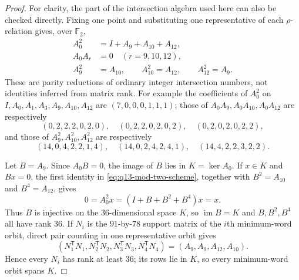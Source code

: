 \documentclass[11pt]{article}
\theoremstyle{remark}
\newcommand{\F}{\mathbb{F}}
\begin{document}
\begin{proof}
For clarity, the part of the intersection algebra used here can also be
checked directly.  Fixing one point and substituting one representative of
each $\rho$-relation gives, over $\F_2$,
\begin{equation}
\label{eq:q13-mod-two-scheme}
\begin{split}
 A_0^2&=I+A_9+A_{10}+A_{12},\\
 A_0A_r&=0\quad(r=9,10,12),\\
 A_9^2&=A_{10},\qquad A_{10}^2=A_{12},\qquad A_{12}^2=A_9.
\end{split}
\end{equation}
These are parity reductions of ordinary integer intersection numbers, not
identities inferred from matrix rank.  For example the coefficients of
$A_0^2$ on
$I,A_0,A_1,A_3,A_9,A_{10},A_{12}$ are
$(7,0,0,0,1,1,1)$; those of $A_0A_9,A_0A_{10},A_0A_{12}$ are respectively
\[
 (0,2,2,2,0,2,0),\quad
 (0,2,2,0,2,0,2),\quad
 (0,2,0,2,0,2,2),
\]
and those of $A_9^2,A_{10}^2,A_{12}^2$ are respectively
\[
 (14,0,4,2,2,1,4),\quad
 (14,0,2,4,2,4,1),\quad
 (14,4,2,2,3,2,2).
\]

Let $B=A_9$.  Since $A_0B=0$, the image of $B$ lies in
$K=\ker A_0$.  If $x\in K$ and $Bx=0$, the first identity in
\eqref{eq:q13-mod-two-scheme}, together with $B^2=A_{10}$ and
$B^4=A_{12}$, gives
\[
 0=A_0^2x=(I+B+B^2+B^4)x=x.
\]
Thus $B$ is injective on the $36$-dimensional space $K$, so
$\operatorname{im}B=K$ and $B,B^2,B^4$ all have rank $36$.  If $N_i$ is
the $91$-by-$78$ support matrix of the $i$th minimum-word orbit, direct
pair counting in one representative orbit gives
\[
 (N_1^{\mathsf T}N_1,N_2^{\mathsf T}N_2,
   N_3^{\mathsf T}N_3,N_4^{\mathsf T}N_4)
   =(A_9,A_9,A_{12},A_{10}).
\]
Hence every $N_i$ has rank at least $36$; its rows lie in $K$, so every
minimum-word orbit spans $K$.


\end{proof}
\end{document}
